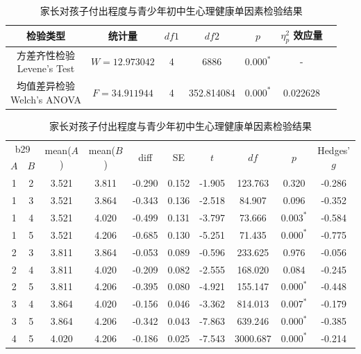 \documentclass[zihao = -4, linespread = 1.5]{article}
\begin{document}
\begin{table}[htbp]
    \centering
    \setlength{\tabcolsep}{8pt}
    \renewcommand{\arraystretch}{1.2}
    \caption{家长对孩子付出程度与青少年初中生心理健康单因素检验结果}\label{table-anova-effort-health}
    \begin{tabular}{ccccccc}
        \bottomrule[1.5pt]
        检验类型 & 统计量 & $df1$ & $df2$ & $p$ & $\eta^2_p$ 效应量 \\
        \midrule[0.75pt]
        \makecell{方差齐性检验 \\ Levene's Test} & $W=12.973042$ & 4 & 6886 & $\bm{0.000^{*}}$ & - \\
        \midrule[0.75pt]
        \makecell{均值差异检验 \\ Welch's ANOVA} & $F=34.911944$ & 4 & 352.814084 & $\bm{0.000^{*}}$ & 0.022628 \\
    \end{tabular}
    \setlength{\tabcolsep}{6pt}
    \renewcommand{\arraystretch}{1.2}
    \begin{tabular}{cccccccccc}
        \bottomrule[1.5pt]
        \multicolumn{2}{c}{b29} & \multirow{2}{*}{mean($A$)} & \multirow{2}{*}{mean($B$)} & \multirow{2}{*}{diff} & \multirow{2}{*}{SE} & \multirow{2}{*}{$t$} & \multirow{2}{*}{$df$} & \multirow{2}{*}{$p$} & \multirow{2}{*}{Hedges' $g$} \\
        \cmidrule[0.75pt](lr){1-2}
        $A$ & $B$ \\
        \midrule[0.75pt]
        1 & 2 & 3.521 & 3.811 & -0.290 & 0.152 & -1.905 & 123.763 & 0.320 & -0.286 \\
        1 & 3 & 3.521 & 3.864 & -0.343 & 0.136 & -2.518 & 84.907 & 0.096 & -0.352 \\
        1 & 4 & 3.521 & 4.020 & -0.499 & 0.131 & -3.797 & 73.666 & $\bm{0.003^{*}}$ & -0.584 \\
        1 & 5 & 3.521 & 4.206 & -0.685 & 0.130 & -5.251 & 71.435 & $\bm{0.000^{*}}$ & -0.775 \\
        2 & 3 & 3.811 & 3.864 & -0.053 & 0.089 & -0.596 & 233.625 & 0.976 & -0.056 \\
        2 & 4 & 3.811 & 4.020 & -0.209 & 0.082 & -2.555 & 168.020 & 0.084 & -0.245 \\
        2 & 5 & 3.811 & 4.206 & -0.395 & 0.080 & -4.921 & 155.147 & $\bm{0.000^{*}}$ & -0.448 \\
        3 & 4 & 3.864 & 4.020 & -0.156 & 0.046 & -3.362 & 814.013 & $\bm{0.007^{*}}$ & -0.179 \\
        3 & 5 & 3.864 & 4.206 & -0.342 & 0.043 & -7.863 & 639.246 & $\bm{0.000^{*}}$ & -0.385 \\
        4 & 5 & 4.020 & 4.206 & -0.186 & 0.025 & -7.543 & 3000.687 & $\bm{0.000^{*}}$ & -0.214 \\
        \toprule[1.5pt]
    \end{tabular}
\end{table}
\end{document}
